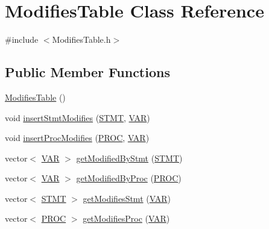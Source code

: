 \hypertarget{class_modifies_table}{\section{Modifies\-Table Class Reference}
\label{class_modifies_table}
}


{\ttfamily \#include $<$Modifies\-Table.\-h$>$}

\subsection*{Public Member Functions}
\begin{DoxyCompactItemize}
\item 
\hyperlink{class_modifies_table_a2dea8d4e7a270929f4377c67373fca37}{Modifies\-Table} ()
\item 
void \hyperlink{class_modifies_table_a3e91bef9a2c4013c88d228a525a33cdc}{insert\-Stmt\-Modifies} (\hyperlink{std_afx_8h_a4a876b28ac3f59cecb39c2d2d76e4e7a}{S\-T\-M\-T}, \hyperlink{std_afx_8h_a3112e3faf0465bb5d85272a347b7f2f1}{V\-A\-R})
\item 
void \hyperlink{class_modifies_table_a7778040a756972c67fde562a11ff60cd}{insert\-Proc\-Modifies} (\hyperlink{std_afx_8h_aa07ea1d188c7b45668f1bd82ffd6d87e}{P\-R\-O\-C}, \hyperlink{std_afx_8h_a3112e3faf0465bb5d85272a347b7f2f1}{V\-A\-R})
\item 
vector$<$ \hyperlink{std_afx_8h_a3112e3faf0465bb5d85272a347b7f2f1}{V\-A\-R} $>$ \hyperlink{class_modifies_table_ac22b398e6014719c45a3e7cdb64a9e7d}{get\-Modified\-By\-Stmt} (\hyperlink{std_afx_8h_a4a876b28ac3f59cecb39c2d2d76e4e7a}{S\-T\-M\-T})
\item 
vector$<$ \hyperlink{std_afx_8h_a3112e3faf0465bb5d85272a347b7f2f1}{V\-A\-R} $>$ \hyperlink{class_modifies_table_a9165ee107f7534642ad8c3d896a53f8f}{get\-Modified\-By\-Proc} (\hyperlink{std_afx_8h_aa07ea1d188c7b45668f1bd82ffd6d87e}{P\-R\-O\-C})
\item 
vector$<$ \hyperlink{std_afx_8h_a4a876b28ac3f59cecb39c2d2d76e4e7a}{S\-T\-M\-T} $>$ \hyperlink{class_modifies_table_a7409a0061105a3b15e37304716f9fea0}{get\-Modifies\-Stmt} (\hyperlink{std_afx_8h_a3112e3faf0465bb5d85272a347b7f2f1}{V\-A\-R})
\item 
vector$<$ \hyperlink{std_afx_8h_aa07ea1d188c7b45668f1bd82ffd6d87e}{P\-R\-O\-C} $>$ \hyperlink{class_modifies_table_ac008bce49680e1faf50112f70e955e61}{get\-Modifies\-Proc} (\hyperlink{std_afx_8h_a3112e3faf0465bb5d85272a347b7f2f1}{V\-A\-R})
\item 

\end{DoxyCompactItemize}
